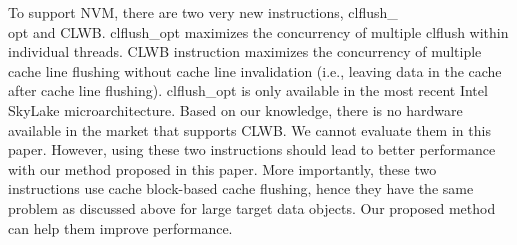 To support NVM, there are two very new instructions, {\selectfont clflush\_\\opt} and {\selectfont CLWB}.
{\selectfont clflush\_opt} maximizes the concurrency of multiple {\selectfont clflush} within individual threads. {\selectfont CLWB} instruction maximizes the concurrency of
multiple cache line flushing without cache line invalidation (i.e., leaving data in the cache after cache line flushing).
{\selectfont clflush\_opt} is only available in the most recent Intel SkyLake microarchitecture. Based on our knowledge,
there is no hardware available in the market that supports {\selectfont CLWB}.
We cannot evaluate them in this paper. However,
using these two instructions should lead to better performance 
with our method proposed in this paper. More importantly, these two instructions use cache block-based cache flushing, hence they have the same problem as discussed above for large target data objects. Our proposed method can help them improve performance.











